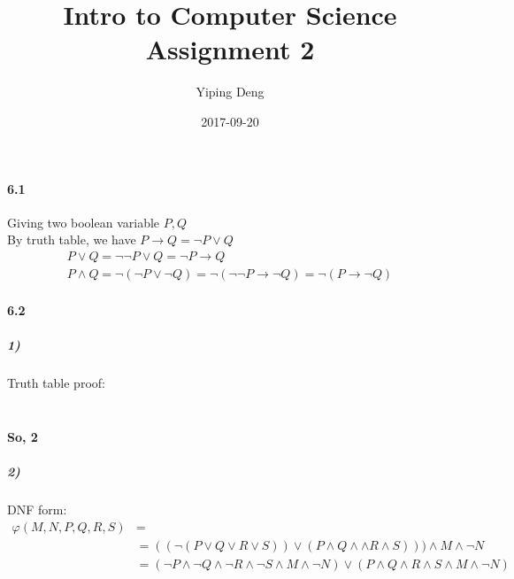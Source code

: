 \documentclass{article}
\title{Intro to Computer Science Assignment 2}
\date{2017-09-20}
\author{Yiping Deng}
\begin{document}
\maketitle
\paragraph{6.1}
Giving two boolean variable $P,Q$\\
By truth table, we have $ P \to Q = \neg P \lor Q $
\begin{align*}
  P \lor Q = \neg \neg P \lor Q = \neg P \to Q \\
  P \land Q = \neg (\neg P \lor \neg Q) = \neg( \neg \neg P \to \neg Q) = \neg (P \to \neg Q)
\end{align*}


\paragraph{6.2}
\subparagraph{1)}
Truth table proof:
\inputminted{text}{table1.md}
\newpage
\inputminted{text}{table2.md}
\textbf{So, 2}
\subparagraph{2)}
DNF form:
\begin{align*}
    \varphi(M, N, P, Q, R, S) &= \\
    &= ((\neg (P \lor Q \lor R \lor S)) \lor (P \land Q \land \land R \land S))) \land M \land \neg N \\
    &= (\neg P \land \neg Q \land \neg R \land \neg S \land M \land \neg N) \lor (P \land Q \land R \land S \land M \land \neg N) \\
\end{align*}
\end{document}
